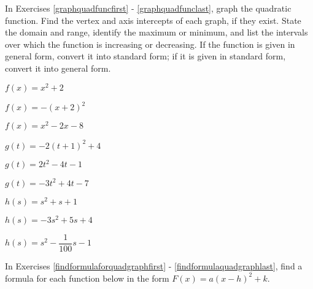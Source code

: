 \startexenum

In Exercises \ref{graphquadfuncfirst} - \ref{graphquadfunclast}, graph the quadratic function.  Find the vertex and axis intercepts of each graph, if they exist.  State the domain and range, identify the maximum or minimum, and list the intervals over which the function is increasing or decreasing.  If the function is given in general form, convert it into standard form; if it is given in standard form, convert it into general form.  

\begin{shortexenum}
\item $f(x) = x^{2} + 2$ \label{graphquadfuncfirst}
\item $f(x) = -(x + 2)^{2}$
\item $f(x) = x^{2} - 2x - 8$
\item $g(t) = -2(t + 1)^{2} + 4$
\item $g(t) = 2t^2 - 4t - 1$
\item $g(t) = -3t^{2} + 4t - 7$
\item  $h(s) = s^2 + s + 1$
\item  $h(s)  = -3s^2+5s+4$
\item $h(s) = s^{2} - \dfrac{1}{100} s - 1$ \label{graphquadfunclast}
\end{shortexenum}

In Exercises \ref{findformulaforquadgraphfirst} - \ref{findformulaquadgraphlast}, find a formula for each function below in the form $F(x) = a(x-h)^2+k$.

